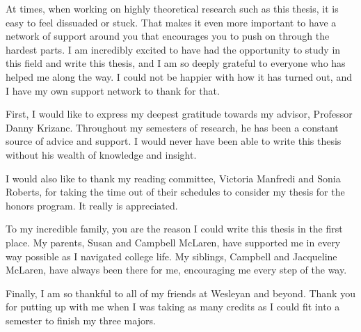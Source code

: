 \begin{acknowledgements}
    At times, when working on highly theoretical research such as this thesis, it is easy to feel dissuaded or stuck. That makes it even more important to have a network of support around you that encourages you to push on through the hardest parts. I am incredibly excited to have had the opportunity to study in this field and write this thesis, and I am so deeply grateful to everyone who has helped me along the way. I could not be happier with how it has turned out, and I have my own support network to thank for that.

    First, I would like to express my deepest gratitude towards my advisor, Professor Danny Krizanc. Throughout my semesters of research, he has been a constant source of advice and support. I would never have been able to write this thesis without his wealth of knowledge and insight.
    
    I would also like to thank my reading committee, Victoria Manfredi and Sonia Roberts, for taking the time out of their schedules to consider my thesis for the honors program. It really is appreciated.

    To my incredible family, you are the reason I could write this thesis in the first place. My parents, Susan and Campbell McLaren, have supported me in every way possible as I navigated college life. My siblings, Campbell and Jacqueline McLaren, have always been there for me, encouraging me every step of the way.

    Finally, I am so thankful to all of my friends at Wesleyan and beyond. Thank you for putting up with me when I was taking as many credits as I could fit into a semester to finish my three majors.

    
    
\end{acknowledgements}